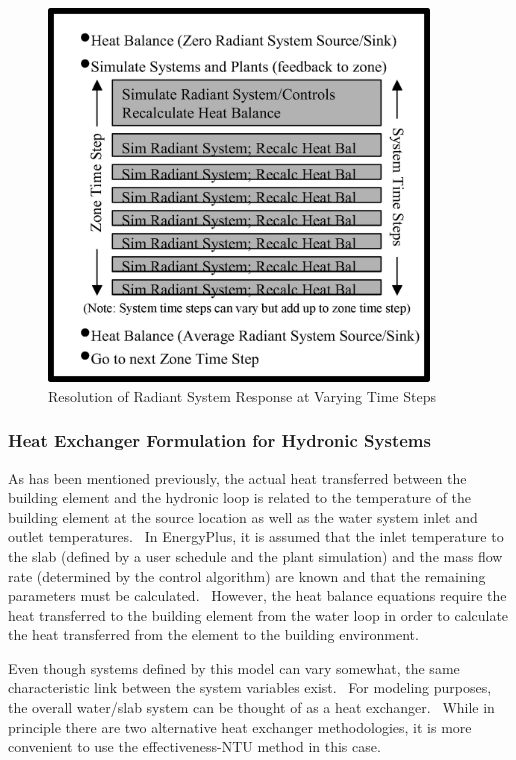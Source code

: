 \begin{figure}[hbtp] %
\centering
\includegraphics[width=0.9\textwidth, height=0.9\textheight, keepaspectratio=true]{media/image6056.png}
\caption{Resolution of Radiant System Response at Varying Time Steps \protect \label{fig:resolution-of-radiant-system-response-at}}
\end{figure}

\subsubsection{Heat Exchanger Formulation for Hydronic Systems}\label{heat-exchanger-formulation-for-hydronic-systems}

As has been mentioned previously, the actual heat transferred between the building element and the hydronic loop is related to the temperature of the building element at the source location as well as the water system inlet and outlet temperatures.~ In EnergyPlus, it is assumed that the inlet temperature to the slab (defined by a user schedule and the plant simulation) and the mass flow rate (determined by the control algorithm) are known and that the remaining parameters must be calculated.~ However, the heat balance equations require the heat transferred to the building element from the water loop in order to calculate the heat transferred from the element to the building environment.

Even though systems defined by this model can vary somewhat, the same characteristic link between the system variables exist.~ For modeling purposes, the overall water/slab system can be thought of as a heat exchanger.~ While in principle there are two alternative heat exchanger methodologies, it is more convenient to use the effectiveness-NTU method in this case.

